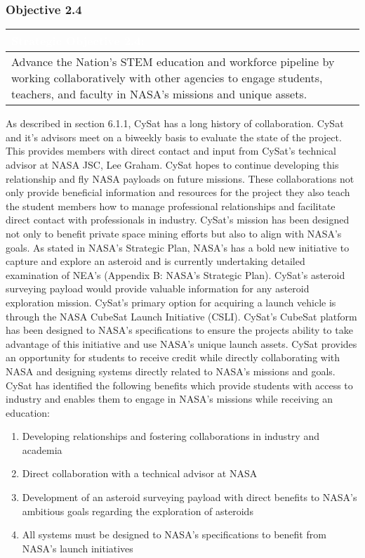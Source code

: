 \documentclass[nocover]            %
{CSLI}                       %
\begin{document}
\subsubsection{Objective 2.4}

\begin{table}[H]
\centering
\begin{tabular}{| p{\textwidth} |}
\arrayrulecolor{white}
\hline
\rowcolor{gray!80}
\textcolor{white}{\textbf{Strategic Objective 2.4: }} \\ \hline
\rowcolor{gray!10}
Advance the Nation's STEM education and workforce pipeline by working collaboratively with other agencies to engage students, teachers, and faculty in NASA's missions and unique assets.\\ \hline
\end{tabular}
\end{table}
As described in section 6.1.1, CySat has a long history of collaboration. CySat and it's advisors meet on a biweekly basis to evaluate the state of the project. This provides members with direct contact and input from CySat's technical advisor at NASA JSC, Lee Graham. CySat hopes to continue developing this relationship and fly NASA payloads on future missions. These collaborations not only provide beneficial information and resources for the project they also teach the student members how to manage professional relationships and facilitate direct contact with professionals in industry. CySat's mission has been designed not only to benefit private space mining efforts but also to align with NASA's goals. As stated in NASA's Strategic Plan, NASA's has a bold new initiative to capture and explore an asteroid and is currently undertaking detailed examination of NEA's (Appendix B: NASA's Strategic Plan). CySat's asteroid surveying payload would provide valuable information for any asteroid exploration mission. CySat's primary option for acquiring a launch vehicle is through the NASA CubeSat Launch Initiative (CSLI). CySat's CubeSat platform has been designed to NASA's specifications to ensure the projects ability to take advantage of this initiative and use NASA's unique launch assets. CySat provides an opportunity for students to receive credit while directly collaborating with NASA and designing systems directly related to NASA's missions and goals.\\
\indent CySat has identified the following benefits which provide students with access to industry and enables them to engage in NASA's missions while receiving an education:
\begin{enumerate}
\item{Developing relationships and fostering collaborations in industry and academia}
\item{Direct collaboration with a technical advisor at NASA}
\item{Development of an asteroid surveying payload with direct benefits to NASA's ambitious goals regarding the exploration of asteroids}
\item{All systems must be designed to NASA's specifications to benefit from NASA's launch initiatives}
\end {enumerate}
\end{document}
